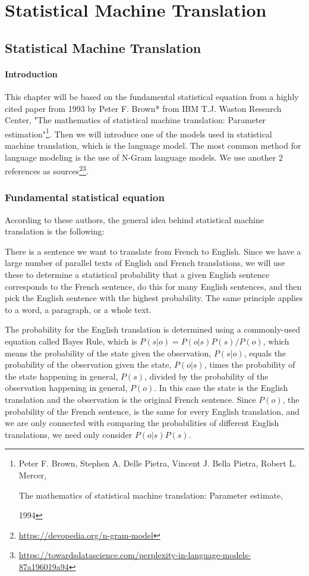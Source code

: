 \part{Statistical Machine Translation}
\chapter{Statistical Machine Translation}
\subsection*{Introduction}
This chapter will be based on the fundamental statistical equation from a highly cited paper from 1993 by Peter F. Brown* from IBM T.J. Waston Research Center, "The mathematics of statistical machine translation: Parameter estimation"\footnote{Peter F. Brown, Stephen A. Delle Pietra, Vincent J. Bella Pietra, Robert L. Mercer, 
\begin{itshape}The mathematics of statistical machine translation: Parameter estimate,
\end{itshape} 1994
}. 
Then we will introduce one of the models used in statistical machine translation, which is the language model. The most common method for language modeling is the use of N-Gram language models. We use another 2 references as sources\footnote{\url{https://devopedia.org/n-gram-model}}\footnote{\url{https://towardsdatascience.com/perplexity-in-language-models-87a196019a94}}.

\renewcommand\thefootnote{\ding{\numexpr171+\value{footnote}}}
\minitoc


\section{Fundamental statistical equation}
According to these authors, the general idea behind statistical machine translation is the following:

There is a sentence we want to translate from French to English. Since we have a large number of parallel texts of English and French translations, we will use these to determine a statistical probability that a given English sentence corresponds to the French sentence, do this for many English sentences, and then pick the English sentence with the highest probability. The same principle applies to a word, a paragraph, or a whole text.

The probability for the English translation is determined using a commonly-used equation called Bayes Rule, which is $P(s|o) = P(o|s)P(s)/P(o)$, which means the probability of the state given the observation, $P(s|o)$, equals the probability of the observation given the state, $P(o|s)$, times the probability of the state happening in general, $P(s)$, divided by the probability of the observation happening in general, $P(o)$. In this case the state is the English translation and the observation is the original French sentence. Since $P(o)$, the probability of the French sentence, is the same for every English translation, and we are only connected with comparing the probabilities of different English translations, we need only consider $P(o|s)P(s)$.

